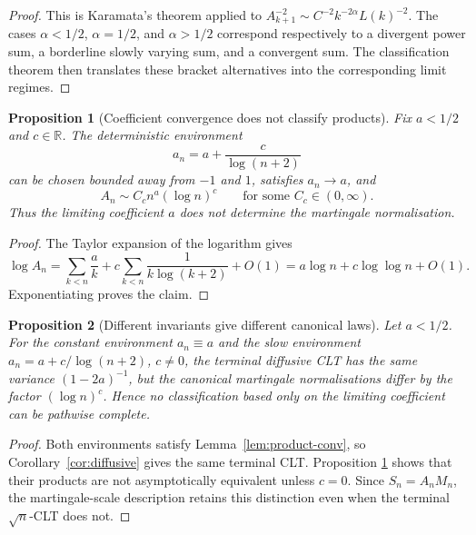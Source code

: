\documentclass[11pt]{article}
\newtheorem{proposition}{Proposition}
\theoremstyle{definition}
\theoremstyle{remark}
\newcommand{\R}{\mathbb{R}}
\newcommand{\1}{\mathbf{1}}
\begin{document}
\begin{proof}
This is Karamata's theorem applied to
\(A_{k+1}^{-2}\sim C^{-2}k^{-2\alpha}L(k)^{-2}\). The cases
\(\alpha<1/2\), \(\alpha=1/2\), and \(\alpha>1/2\) correspond respectively to a
divergent power sum, a borderline slowly varying sum, and a convergent sum. The
classification theorem then translates these bracket alternatives into the
corresponding limit regimes.
\end{proof}

\begin{proposition}[Coefficient convergence does not classify products]\label{prop:slow}
Fix \(a<1/2\) and \(c\in\R\). The deterministic environment
\[
  a_n=a+\frac{c}{\log(n+2)}
\]
can be chosen bounded away from \(-1\) and \(1\), satisfies \(a_n\to a\), and
\[
  A_n\sim C_c n^a(\log n)^c
  \qquad\text{for some }C_c\in(0,\infty).
\]
Thus the limiting coefficient \(a\) does not determine the martingale
normalisation.
\end{proposition}

\begin{proof}
The Taylor expansion of the logarithm gives
\[
  \log A_n
  =
  \sum_{k<n}\frac{a}{k}
  +c\sum_{k<n}\frac1{k\log(k+2)}
  +O(1)
  =
  a\log n+c\log\log n+O(1).
\]
Exponentiating proves the claim.
\end{proof}

\begin{proposition}[Different invariants give different canonical laws]\label{prop:different}
Let \(a<1/2\). For the constant environment \(a_n\equiv a\) and the slow
environment \(a_n=a+c/\log(n+2)\), \(c\ne0\), the terminal diffusive CLT has the
same variance \((1-2a)^{-1}\), but the canonical martingale normalisations differ
by the factor \((\log n)^c\). Hence no classification based only on the limiting
coefficient can be pathwise complete.
\end{proposition}

\begin{proof}
Both environments satisfy Lemma~\ref{lem:product-conv}, so
Corollary~\ref{cor:diffusive} gives the same terminal CLT. Proposition
\ref{prop:slow} shows that their products are not asymptotically equivalent
unless \(c=0\). Since \(S_n=A_nM_n\), the martingale-scale description retains
this distinction even when the terminal \(\sqrt n\)-CLT does not.
\end{proof}
\end{document}
